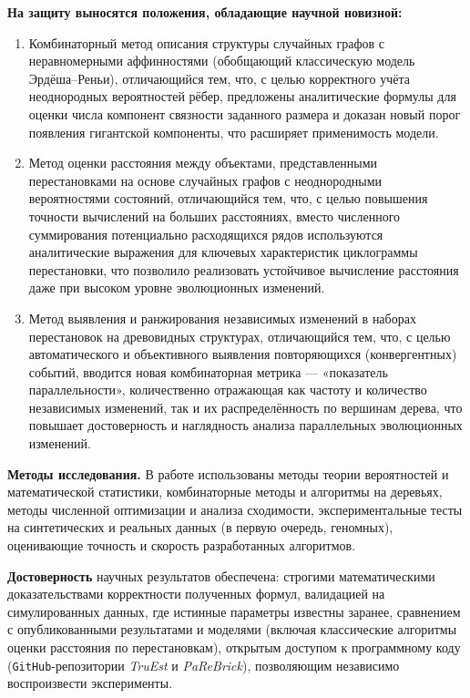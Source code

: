 \textbf{На защиту выносятся положения, обладающие научной новизной:}

\begin{enumerate}
    \item Комбинаторный метод описания структуры случайных графов с неравномерными аффинностями (обобщающий классическую модель Эрдёша--Реньи), отличающийся тем, что, с целью корректного учёта неоднородных вероятностей рёбер, предложены аналитические формулы для оценки числа компонент связности заданного размера и доказан новый порог появления гигантской компоненты, что расширяет применимость модели.

    \item Метод оценки расстояния между объектами, представленными перестановками на основе случайных графов с неоднородными вероятностями состояний, отличающийся тем, что, с целью повышения точности вычислений на больших расстояниях, вместо численного суммирования потенциально расходящихся рядов используются аналитические выражения для ключевых характеристик циклограммы перестановки, что позволило реализовать устойчивое вычисление расстояния даже при высоком уровне эволюционных изменений.

    \item Метод выявления и ранжирования независимых изменений в наборах перестановок на древовидных структурах, отличающийся тем, что, с целью автоматического и объективного выявления повторяющихся (конвергентных) событий, вводится новая комбинаторная метрика — «показатель параллельности», количественно отражающая как частоту и количество независимых изменений, так и их распределённость по вершинам дерева, что повышает достоверность и наглядность анализа параллельных эволюционных изменений.
\end{enumerate}

\textbf{Методы исследования.} 
В работе использованы методы теории вероятностей и математической статистики, комбинаторные методы и алгоритмы на деревьях, методы численной оптимизации и анализа сходимости, экспериментальные тесты на синтетических и реальных данных (в первую очередь, геномных), оценивающие точность и скорость разработанных алгоритмов.

\textbf{Достоверность} научных результатов обеспечена: строгими математическими доказательствами корректности полученных формул, валидацией на симулированных данных, где истинные параметры известны заранее, сравнением с опубликованными результатами и моделями (включая классические алгоритмы оценки расстояния по перестановкам), открытым доступом к программному коду (\texttt{GitHub}-репозитории \emph{TruEst} и \emph{PaReBrick}), позволяющим независимо воспроизвести эксперименты.

